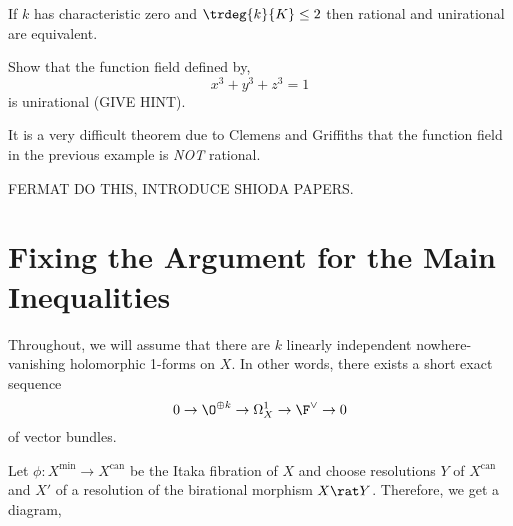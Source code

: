 \documentclass[12pt]{article}
\begin{document}
If $k$ has characteristic zero and $\trdeg{k}{K} \le 2$ then rational and unirational are equivalent. 


\begin{exercise}
Show that the function field defined by,
\[ x^3 + y^3 + z^3 = 1 \]
is unirational (GIVE HINT).
\end{exercise}

It is a very difficult theorem due to Clemens and Griffiths that the function field in the previous example is \textit{NOT} rational.


\begin{example}
FERMAT DO THIS, INTRODUCE SHIODA PAPERS.
\end{example}

\section{Fixing the Argument for the Main Inequalities}

\newcommand{\can}{\mathrm{can}}


Throughout, we will assume that there are $k$ linearly independent nowhere-vanishing holomorphic 1-forms on $X$. In other words, there exists a short exact sequence
\[ 0 \rightarrow \O^{\oplus k} \rightarrow \Omega_{X}^{1} \rightarrow \F^{\vee} \rightarrow 0 \]
of vector bundles. 

Let $\phi : X^{\min} \to X^{\can}$ be the Itaka fibration of $X$ and choose resolutions $Y$ of $X^{\can}$ and $X'$ of a resolution of the birational morphism $X \rat Y$. Therefore, we get a diagram,
\end{document}
